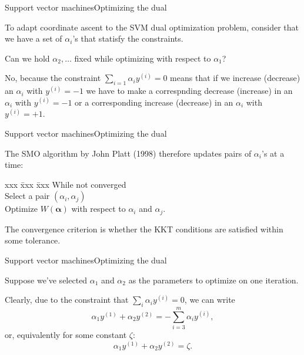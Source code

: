 \documentclass{beamer}
\renewcommand{\vec}[1]{\boldsymbol{#1}}
\begin{document}
\begin{frame}{Support vector machines}{Optimizing the dual}

  To adapt coordinate ascent to the SVM dual optimization problem,
  consider that we have a set of $\alpha_i$'s that statisfy the constraints.

  \medskip

  Can we hold $\alpha_2,\ldots$ fixed while optimizing with respect to
  $\alpha_1$?

  \medskip

  No, because the constraint $\sum_{i=1}\alpha_iy^{(i)} = 0$ means that if we
  increase (decrease) an $\alpha_i$ with $y^{(i)}=-1$ we have to make a
  correspnding decrease (increase) in an $\alpha_i$ with $y^{(i)}=-1$
  or a corresponding increase (decrease) in an $\alpha_i$ with $y^{(i)}=+1$.
  
\end{frame}


\begin{frame}{Support vector machines}{Optimizing the dual}

  The SMO algorithm by John Platt (1998) therefore updates \alert{pairs}
  of $\alpha_i$'s at a time:

  \begin{tabbing}
    xxx \= xxx \= xxx \kill
    While not converged \\
    \> Select a pair $(\alpha_i,\alpha_j)$ \\
    \> Optimize $W(\vec{\alpha})$ with respect to $\alpha_i$ and $\alpha_j$.
  \end{tabbing}

  \medskip

  The convergence criterion is whether the KKT conditions are
  satisfied within some tolerance.
  
\end{frame}


\begin{frame}{Support vector machines}{Optimizing the dual}

  Suppose we've selected $\alpha_1$ and $\alpha_2$ as the parameters
  to optimize on one iteration.

  \medskip

  Clearly, due to the constraint that $\sum_i \alpha_iy^{(i)} = 0$, we can
  write
  \[ \alpha_1 y^{(1)} + \alpha_2 y^{(2)} = - \sum_{i=3}^m \alpha_i y^{(i)}, \]
  or, equivalently for some constant $\zeta$:
  \[ \alpha_1 y^{(1)} + \alpha_2 y^{(2)} = \zeta. \]
  
\end{frame}
\end{document}
